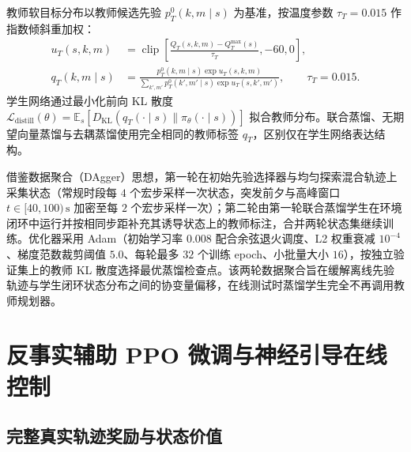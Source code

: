 教师软目标分布以教师候选先验 $p_T^0(k,m\mid s)$ 为基准，按温度参数 $\tau_T=0.015$ 作指数倾斜重加权：
\begin{equation}
 \begin{aligned}
 u_T(s,k,m)&=\operatorname{clip}\left[
 \frac{Q_T(s,k,m)-Q_T^{\max}(s)}{\tau_T},-60,0\right],\\
 q_T(k,m\mid s)&=\frac{p_T^0(k,m\mid s)\exp u_T(s,k,m)}
 {\sum_{k',m'}p_T^0(k',m'\mid s)\exp u_T(s,k',m')},
 \qquad\tau_T=0.015.
 \end{aligned}
 \label{eq:ch5-teacher}
\end{equation}
学生网络通过最小化前向 KL 散度 $\mathcal{L}_{\mathrm{distill}}(\theta)=\mathbb{E}_{s}[D_{\mathrm{KL}}(q_T(\cdot\mid s)\|\pi_\theta(\cdot\mid s))]$ 拟合教师分布。联合蒸馏、无期望向量蒸馏与去耦蒸馏使用完全相同的教师标签 $q_T$，区别仅在学生网络表达结构。

借鉴数据聚合（DAgger）思想\cite{ross2011dagger}，第一轮在初始先验选择器与均匀探索混合轨迹上采集状态（常规时段每 $4$ 个宏步采样一次状态，突发前夕与高峰窗口 $t\in[40,100)\,\mathrm{s}$ 加密至每 $2$ 个宏步采样一次）；第二轮由第一轮联合蒸馏学生在环境闭环中运行并按相同步距补充其诱导状态上的教师标注，合并两轮状态集继续训练。优化器采用 Adam（初始学习率 $0.008$ 配合余弦退火调度、L2 权重衰减 $10^{-4}$、梯度范数裁剪阈值 $5.0$、每轮最多 $32$ 个训练 epoch、小批量大小 $16$），按独立验证集上的教师 KL 散度选择最优蒸馏检查点。该两轮数据聚合旨在缓解离线先验轨迹与学生闭环状态分布之间的协变量偏移，在线测试时蒸馏学生完全不再调用教师规划器。

\section{反事实辅助 PPO 微调与神经引导在线控制}
\label{sec:ch5-rl}
\label{sec:ch5-deployment}

\subsection{完整真实轨迹奖励与状态价值}

